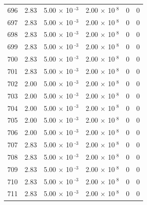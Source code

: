 \documentclass[a4paper,11pt]{article}
\begin{document}
\begin{center}
\begin{longtable}{|R{1.5cm}|R{2.4cm}|R{2.4cm}|R{2.4cm}|R{2.4cm}|R{2.4cm}|}
  696 &   2.83  &         5.00 $\times$ 10$^{\text{          -3}}$  &         2.00 $\times$ 10$^{\text{           8}}$  & 0  & 0 \\
  697 &   2.83  &         5.00 $\times$ 10$^{\text{          -3}}$  &         2.00 $\times$ 10$^{\text{           8}}$  & 0  & 0 \\
  698 &   2.83  &         5.00 $\times$ 10$^{\text{          -3}}$  &         2.00 $\times$ 10$^{\text{           8}}$  & 0  & 0 \\
  699 &   2.83  &         5.00 $\times$ 10$^{\text{          -3}}$  &         2.00 $\times$ 10$^{\text{           8}}$  & 0  & 0 \\
  700 &   2.83  &         5.00 $\times$ 10$^{\text{          -3}}$  &         2.00 $\times$ 10$^{\text{           8}}$  & 0  & 0 \\
  701 &   2.83  &         5.00 $\times$ 10$^{\text{          -3}}$  &         2.00 $\times$ 10$^{\text{           8}}$  & 0  & 0 \\
  702 &   2.00  &         5.00 $\times$ 10$^{\text{          -3}}$  &         2.00 $\times$ 10$^{\text{           8}}$  & 0  & 0 \\
  703 &   2.00  &         5.00 $\times$ 10$^{\text{          -3}}$  &         2.00 $\times$ 10$^{\text{           8}}$  & 0  & 0 \\
  704 &   2.00  &         5.00 $\times$ 10$^{\text{          -3}}$  &         2.00 $\times$ 10$^{\text{           8}}$  & 0  & 0 \\
  705 &   2.00  &         5.00 $\times$ 10$^{\text{          -3}}$  &         2.00 $\times$ 10$^{\text{           8}}$  & 0  & 0 \\
  706 &   2.00  &         5.00 $\times$ 10$^{\text{          -3}}$  &         2.00 $\times$ 10$^{\text{           8}}$  & 0  & 0 \\
  707 &   2.83  &         5.00 $\times$ 10$^{\text{          -3}}$  &         2.00 $\times$ 10$^{\text{           8}}$  & 0  & 0 \\
  708 &   2.83  &         5.00 $\times$ 10$^{\text{          -3}}$  &         2.00 $\times$ 10$^{\text{           8}}$  & 0  & 0 \\
  709 &   2.83  &         5.00 $\times$ 10$^{\text{          -3}}$  &         2.00 $\times$ 10$^{\text{           8}}$  & 0  & 0 \\
  710 &   2.83  &         5.00 $\times$ 10$^{\text{          -3}}$  &         2.00 $\times$ 10$^{\text{           8}}$  & 0  & 0 \\
  711 &   2.83  &         5.00 $\times$ 10$^{\text{          -3}}$  &         2.00 $\times$ 10$^{\text{           8}}$  & 0  & 0 \\

\end{longtable}
\end{center}
\end{document}
